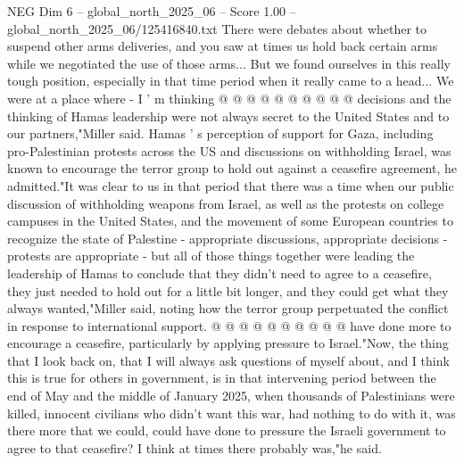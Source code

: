 \begin{textsample}{NEG Dim 6 – global\_north\_2025\_06 – Score 1.00 – global\_north\_2025\_06/125416840.txt}
There were debates about whether to suspend other arms deliveries, and you saw at times us hold back certain arms while we negotiated the use of those arms...
But we found ourselves in this really tough position, especially in that time period when it really came to a head...
We were at a place where - I ' m thinking @ @ @ @ @ @ @ @ @ @ decisions and the thinking of Hamas leadership were not always secret to the United States and to our partners,"Miller said.
Hamas ' s perception of support for Gaza, including pro-Palestinian protests across the US and discussions on withholding Israel, was known to encourage the terror group to hold out against a ceasefire agreement, he admitted."It was clear to us in that period that there was a time when our public discussion of withholding weapons from Israel, as well as the protests on college campuses in the United States, and the movement of some European countries to recognize the state of Palestine - appropriate discussions, appropriate decisions - protests are appropriate - but all of those things together were leading the leadership of Hamas to conclude that they didn't need to agree to a ceasefire, they just needed to hold out for a little bit longer, and they could get what they always wanted,"Miller said, noting how the terror group perpetuated the conflict in response to international support. @ @ @ @ @ @ @ @ @ @ have done more to encourage a ceasefire, particularly by applying pressure to Israel."Now, the thing that I look back on, that I will always ask questions of myself about, and I think this is true for others in government, is in that intervening period between the end of May and the middle of January 2025, when thousands of Palestinians were killed, innocent civilians who didn't want this war, had nothing to do with it, was there more that we could, could have done to pressure the Israeli government to agree to that ceasefire?
I think at times there probably was,"he said.

\end{textsample}

